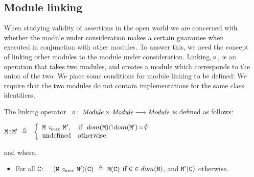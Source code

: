 \subsection{Module linking}

When studying validity of assertions in the open world we are concerned with whether   the  module
under consideration makes  a certain guarantee when executed in conjunction with other modules. To answer this, we
 need the concept of linking other modules to the module  under consideration.
 Linking, $\!\circ\!$ ,  is an operation that takes two modules, and creates a module which corresponds  to the union of the two.
We place some conditions for module linking to be defined: We require that the two modules do not contain implementations for the same class identifiers,



\begin{definition}
\label{def:link}
The linking operator\  \ $\!\circ\!:\  {\mbox{\tt{{\it Module}}}} \times  {\mbox{\tt{{\it Module}}}} \longrightarrow {\mbox{\tt{{\it Module}}}}$ is defined as follows:

$
\M \link \M{'}  \ \triangleq  \ \ \left\{
\begin{array}{l}
                        \M\ \link\!_{aux}\ \M{'},\ \ \   \hbox{if}\  \ dom(\M)\!\cap\!dom(\M')\!=\!\emptyset\\
\mbox{undefined}  \ \ \ \mbox{otherwise.}
\end{array}
                    \right.$

and where,
\begin{itemize}
     \item
   For all  ${\mbox{\tt{C}}}$: \ \
   $(\M\ \link\!_{aux}\ \M')(\prg{C})\  \triangleq  \ \M(\prg{C})$  if  ${\mbox{\tt{C}}}\in dom({\mbox{\tt{\ensuremath{{\mbox{\tt{M}}}}}}})$, and  ${\mbox{\tt{\ensuremath{{\mbox{\tt{M}}}}}}}'({\mbox{\tt{C}}})$ otherwise.
 \end{itemize}
\end{definition}

